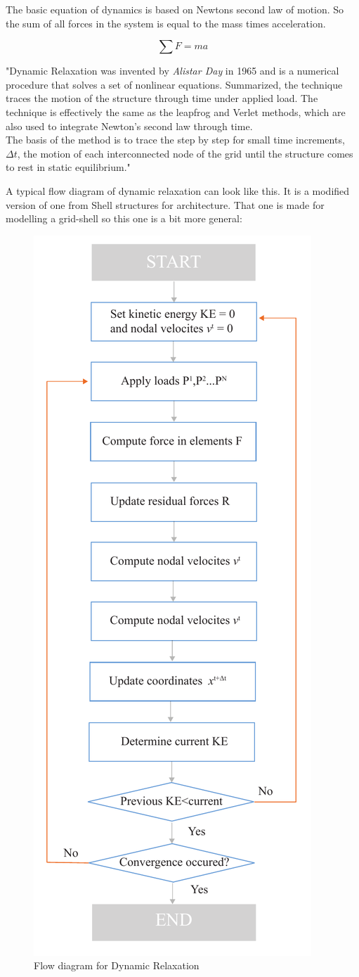 The basic equation of dynamics is based on Newtons second law of motion. So the sum of all forces in the system is equal to the mass times acceleration.

\begin{equation}
\sum F = ma
\end{equation}

"Dynamic Relaxation was invented by \textit{ Alistar Day} in 1965 and is a numerical procedure that solves a set of nonlinear equations. Summarized, the technique traces the motion of the structure through time under applied load. The technique is effectively the same as the leapfrog and Verlet methods, which are also used to integrate Newton's second law through time.\\
The basis of the method is to trace the step by step for small time increments, $\Delta t$, the motion of each interconnected node of the grid until the structure comes to rest in static equilibrium."

A typical flow diagram of dynamic relaxation can look like this. It is a modified version of one from Shell structures for architecture. That one is made for modelling a grid-shell so this one is a bit more general:

\begin{figure}[H]
\centering
\includegraphics[height=1.2\linewidth ]{figure/Theory/DRScheme.pdf}
\caption{Flow diagram for Dynamic Relaxation }
\end{figure}


